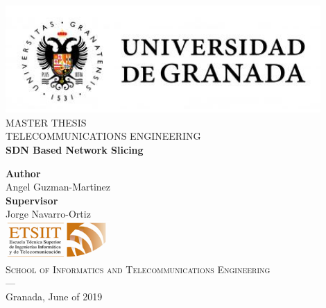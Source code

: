 \begin{titlepage}

\newlength{\centeroffset}
\setlength{\centeroffset}{-0.5\oddsidemargin}
\addtolength{\centeroffset}{0.5\evensidemargin}
\thispagestyle{empty}

\noindent\hspace*{\centeroffset}\begin{minipage}{\textwidth}

\centering
\includegraphics[width=0.9\textwidth]{imagenes/logo_ugr.jpg}\\[1.4cm]

\textsc{\Large MASTER THESIS\\[0.2cm]}
\textsc{TELECOMMUNICATIONS ENGINEERING}\\[1cm]
%
{\Huge\bfseries SDN Based Network Slicing\\
}
\end{minipage}

\vspace{2.5cm}
\noindent\hspace*{\centeroffset}\begin{minipage}{\textwidth}
\centering

\textbf{Author}\\ {Angel Guzman-Martinez}\\[2.5ex]
\textbf{Supervisor}\\
{Jorge Navarro-Ortiz}\\[2cm]
\includegraphics[width=0.3\textwidth]{imagenes/etsiit_logo.png}\\[0.1cm]
\textsc{School of Informatics and Telecommunications Engineering}\\
\textsc{---}\\
Granada, June of 2019
\end{minipage}
\end{titlepage}



